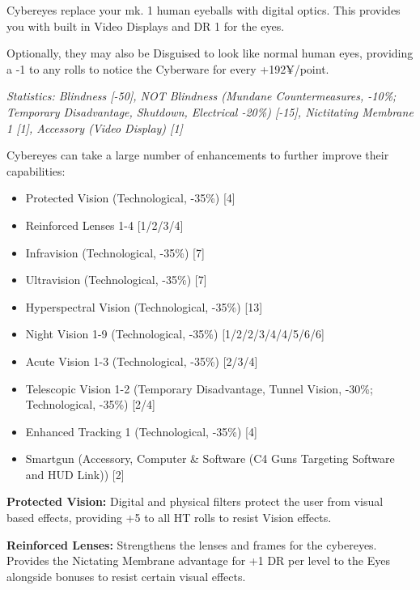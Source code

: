 \begin{multicols*}{3}
	Cybereyes replace your mk. 1 human eyeballs with digital optics. This provides you with built in Video Displays and DR 1 for the eyes.
	
	Optionally, they may also be Disguised to look like normal human eyes, providing a -1 to any rolls to notice the Cyberware for every +192¥/point.
	
	\textit{\textcolor{OliveGreen}{Statistics: Blindness [-50], NOT Blindness (Mundane Countermeasures, -10\%; Temporary Disadvantage, Shutdown, Electrical -20\%) [-15], Nictitating Membrane 1 [1], Accessory (Video Display) [1] }}
	
	Cybereyes can take a large number of enhancements to further improve their capabilities: 
	
	\begin{itemize}
		\item Protected Vision (Technological, -35\%) [4]
		\item Reinforced Lenses 1-4 [1/2/3/4]
		\item Infravision (Technological, -35\%) [7]
		\item Ultravision (Technological, -35\%) [7]
		\item Hyperspectral Vision (Technological, -35\%) [13]
		\item Night Vision 1-9 (Technological, -35\%) [1/2/2/3/4/4/5/6/6]
		\item Acute Vision 1-3 (Technological, -35\%) [2/3/4]
		\item Telescopic Vision 1-2 (Temporary Disadvantage, Tunnel Vision, -30\%; Technological, -35\%) [2/4]
		\item Enhanced Tracking 1 (Technological, -35\%) [4]
		\item Smartgun (Accessory, Computer \& Software (C4 Guns Targeting Software and HUD Link)) [2]
	\end{itemize}

	\textbf{Protected Vision:} Digital and physical filters protect the user from visual based effects, providing +5 to all HT rolls to resist Vision effects.
	
	\textbf{Reinforced Lenses:} Strengthens the lenses and frames for the cybereyes. Provides the Nictating Membrane advantage for +1 DR per level to the Eyes alongside bonuses to resist certain visual effects.
	

\end{multicols*}
